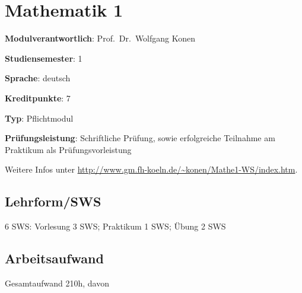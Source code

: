 \hypertarget{mathematik-1pathlabelmi-2017modulbeschreibungen-bachelorba_mathematik1}{%
\chapter{Mathematik
1\label{/mi-2017/modulbeschreibungen-bachelor/BA_Mathematik1}}\label{mathematik-1pathlabelmi-2017modulbeschreibungen-bachelorba_mathematik1}}

\begin{modulHead}
\textbf{Modulverantwortlich}: Prof.~Dr.~Wolfgang
Konen
\end{modulHead}
\begin{modulHead}
\textbf{Studiensemester}:
1
\end{modulHead}
\begin{modulHead}
\textbf{Sprache}:
deutsch
\end{modulHead}
\begin{modulHead}
\textbf{Kreditpunkte}:
7
\end{modulHead}
\begin{modulHead}
\textbf{Typ}:
Pflichtmodul
\end{modulHead}
\begin{modulHead}
\textbf{Prüfungsleistung}:
Schriftliche Prüfung, sowie erfolgreiche Teilnahme am Praktikum als
Prüfungsvorleistung
\end{modulHead}


Weitere Infos unter
\url{http://www.gm.fh-koeln.de/~konen/Mathe1-WS/index.htm}.

\hypertarget{lehrformswspathlabelmi-2017modulbeschreibungen-bachelorba_mathematik1}{%
\section*{Lehrform/SWS\label{/mi-2017/modulbeschreibungen-bachelor/BA_Mathematik1}}\label{lehrformswspathlabelmi-2017modulbeschreibungen-bachelorba_mathematik1}}

6 SWS: Vorlesung 3 SWS; Praktikum 1 SWS; Übung 2 SWS

\hypertarget{arbeitsaufwandpathlabelmi-2017modulbeschreibungen-bachelorba_mathematik1}{%
\section*{Arbeitsaufwand\label{/mi-2017/modulbeschreibungen-bachelor/BA_Mathematik1}}\label{arbeitsaufwandpathlabelmi-2017modulbeschreibungen-bachelorba_mathematik1}}

Gesamtaufwand 210h, davon

